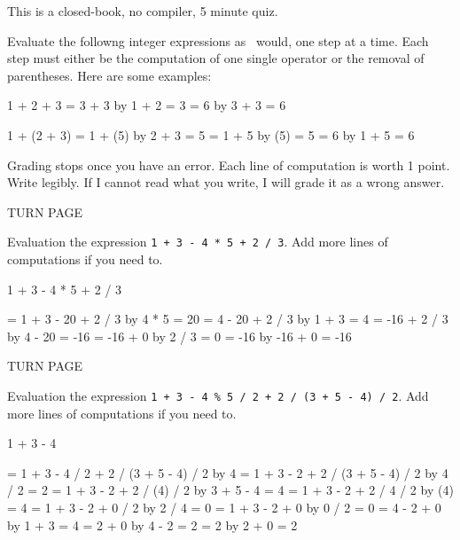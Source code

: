 

This is a closed-book, no compiler, 5 minute quiz.

Evaluate the followng integer expressions as \cpp\ would, one step at a
time.
Each step must either be the computation of one single operator
or the removal of parentheses.
Here are some examples:
\begin{console}
1 + 2 + 3
= 3 + 3          by 1 + 2 = 3
= 6              by 3 + 3 = 6
\end{console}
\begin{console}
1 + (2 + 3)
= 1 + (5)        by 2 + 3 = 5
= 1 + 5          by (5) = 5
= 6              by 1 + 5 = 6
\end{console}

Grading stops once you have an error.
Each line of computation is worth 1 point.
Write legibly.
If I cannot read what you write, I will grade it as a wrong answer.

TURN PAGE

\newpage
\nextq
Evaluation the expression \verb!1 + 3 - 4 * 5 + 2 / 3!.
Add more lines of computations if you need to.
\\
\ANSWER
\begin{answercode}
1 + 3 - 4 * 5 + 2 / 3

= 1 + 3 - 20 + 2 / 3                       by 4 * 5 = 20
= 4 - 20 + 2 / 3                           by 1 + 3 = 4
= -16 + 2 / 3                              by 4 - 20 = -16
= -16 + 0                                  by 2 / 3 = 0
= -16                                      by -16 + 0 = -16

\end{answercode}

TURN PAGE

\newpage
\nextq
Evaluation the expression \verb!1 + 3 - 4 % 5 / 2 + 2 / (3 + 5 - 4) / 2!.
Add more lines of computations if you need to.
\\
\ANSWER
\begin{answercode}
1 + 3 - 4 %

= 1 + 3 - 4 / 2 + 2 / (3 + 5 - 4) / 2       by 4 %
= 1 + 3 - 2 + 2 / (3 + 5 - 4) / 2           by 4 / 2 = 2
= 1 + 3 - 2 + 2 / (4) / 2                   by 3 + 5 - 4 = 4
= 1 + 3 - 2 + 2 / 4 / 2                     by (4) = 4
= 1 + 3 - 2 + 0 / 2                         by 2 / 4 = 0
= 1 + 3 - 2 + 0                             by 0 / 2 = 0
= 4 - 2 + 0                                 by 1 + 3 = 4
= 2 + 0                                     by 4 - 2 = 2
= 2                                         by 2 + 0 = 2

\end{answercode}



